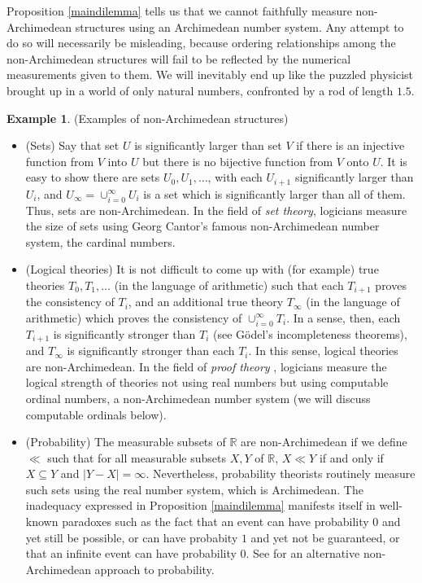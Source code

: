 \documentclass[reqno]{article}
\theoremstyle{definition}
\newtheorem{example}[theorem]{Example}
\begin{document}
Proposition \ref{maindilemma} tells us that we cannot faithfully measure
non-Archimedean structures using an Archimedean number system.
Any attempt to do so will necessarily be misleading, because ordering
relationships among the non-Archimedean structures will fail to be reflected
by the numerical measurements given to them.
We will inevitably end up like the puzzled physicist
brought up in a world of only natural numbers, confronted by a rod of
length $1.5$.

\begin{example}
\label{nonexamples}
(Examples of non-Archimedean structures)
    \begin{itemize}
        \item
        (Sets)
        Say that set $U$ is significantly larger than set $V$ if there is an injective
        function from $V$ into $U$ but there is no bijective function from $V$
        onto $U$. It is easy to show there are sets $U_0,U_1,\ldots$, with each
        $U_{i+1}$ significantly larger than $U_i$, and $U_\infty=\cup_{i=0}^\infty U_i$
        is a set which is significantly larger than all of them. Thus, sets are
        non-Archimedean. In the field of \emph{set theory}, logicians measure
        the size of sets using Georg Cantor's famous non-Archimedean number system,
        the cardinal numbers.
        \item
        (Logical theories)
        It is not difficult to come up with (for example) true
        theories $T_0,T_1,\ldots$ (in the language of arithmetic) such that
        each $T_{i+1}$ proves the consistency of $T_i$, and an additional
        true theory $T_\infty$ (in the language of arithmetic)
        which proves the consistency of $\cup_{i=0}^\infty T_i$.
        In a sense, then, each $T_{i+1}$ is significantly stronger than $T_i$
        (see G\"odel's incompleteness theorems), and $T_\infty$ is
        significantly stronger than each $T_i$. In this sense, logical theories
        are non-Archimedean. In the field
        of \emph{proof theory} \cite{pohlers2008proof},
        logicians measure the logical strength of theories not using real numbers
        but using computable ordinal numbers, a non-Archimedean number system
        (we will discuss computable ordinals below).
        \item
        (Probability)
        The measurable subsets of $\mathbb R$ are non-Archimedean
        if we define $\ll$ such that for all measurable subsets
        $X,Y$ of $\mathbb R$, $X\ll Y$ if and only if
        $X\subseteq Y$ and $|Y-X|=\infty$.
        Nevertheless, probability theorists routinely
        measure such sets using the real number system, which is Archimedean.
        The inadequacy expressed in Proposition \ref{maindilemma}
        manifests itself in well-known paradoxes such as the fact that
        an event can have probability $0$ and yet still be possible,
        or can have probabity $1$ and yet not be guaranteed,
        or that an infinite event can have probability $0$.
        See \cite{benci2013non} for an alternative non-Archimedean approach
        to probability.
    \end{itemize}
\end{example}
\end{document}
